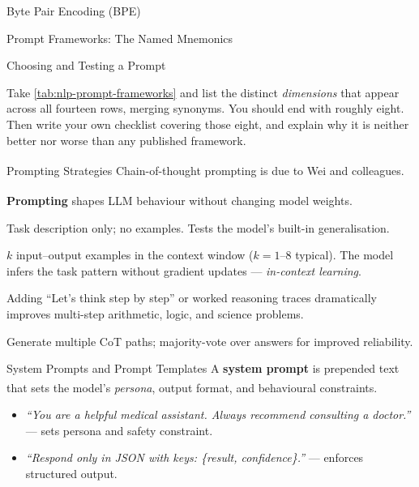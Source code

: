 \begin{v3topic}{Byte Pair Encoding (BPE)}
\begin{v3topic}{Prompt Frameworks: The Named Mnemonics}
\begin{v3topic}{Choosing and Testing a Prompt}
\begin{checkpoint}
Take \cref{tab:nlp-prompt-frameworks} and list the distinct \emph{dimensions}
that appear across all fourteen rows, merging synonyms. You should end with
roughly eight. Then write your own checklist covering those eight, and explain
why it is neither better nor worse than any published framework.
\end{checkpoint}
\end{v3topic}

\begin{v3topic}{Prompting Strategies}
    Chain-of-thought prompting is due to Wei and
    colleagues\textsuperscript{\cite{weiChainofThoughtPrompting2022}}.

    \textbf{Prompting} shapes LLM behaviour without changing model
    weights.\textsuperscript{\cite[][p.~82]{farrisHowLargeLanguage2025}}

    \begin{description}[leftmargin=0.4cm, labelindent=0pt]
        \item[\textbf{Zero-shot}] Task description only; no examples.
              Tests the model's built-in generalisation.
        \item[\textbf{Few-shot}] $k$ input--output examples in the context window
              ($k=1$--$8$ typical). The model infers the task pattern without gradient
              updates --- \emph{in-context learning}.
        \item[\textbf{Chain-of-Thought (CoT)}] Adding ``Let's think step by step'' or
              worked reasoning traces dramatically improves multi-step arithmetic, logic,
              and science problems.
        \item[\textbf{Self-consistency}] Generate multiple CoT paths; majority-vote over
              answers for improved reliability.
    \end{description}

\end{v3topic}
\begin{v3topic}{System Prompts and Prompt Templates}
    A \textbf{system prompt} is prepended text that sets the model's \emph{persona},
    output format, and behavioural
    constraints.\textsuperscript{\cite[][p.~68]{farrisHowLargeLanguage2025}}

    \begin{itemize}
        \item \emph{``You are a helpful medical assistant. Always recommend consulting a
              doctor.''} --- sets persona and safety constraint.
        \item \emph{``Respond only in JSON with keys: \{result, confidence\}.''} ---
              enforces structured output.
    \end{itemize}


\end{v3topic}
\end{v3topic}
\end{v3topic}
